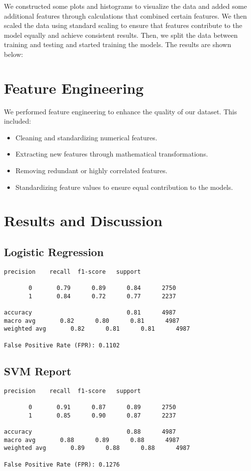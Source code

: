 \documentclass{article}
\begin{document}
We constructed some plots and histograms to visualize the data and added some additional features through calculations that combined certain features. We then scaled the data using standard scaling to ensure that features contribute to the model equally and achieve consistent results. Then, we split the data between training and testing and started training the models. The results are shown below:

\section{Feature Engineering}
We performed feature engineering to enhance the quality of our dataset. This included:
\begin{itemize}
    \item Cleaning and standardizing numerical features.
    \item Extracting new features through mathematical transformations.
    \item Removing redundant or highly correlated features.
    \item Standardizing feature values to ensure equal contribution to the models.
\end{itemize}

\section{Results and Discussion}
\subsection{Logistic Regression}
\begin{verbatim}
precision    recall  f1-score   support

       0       0.79      0.89      0.84      2750
       1       0.84      0.72      0.77      2237

accuracy                           0.81      4987
macro avg       0.82      0.80      0.81      4987
weighted avg       0.82      0.81      0.81      4987

False Positive Rate (FPR): 0.1102  
\end{verbatim}

\subsection{SVM Report}
\begin{verbatim}
precision    recall  f1-score   support

       0       0.91      0.87      0.89      2750
       1       0.85      0.90      0.87      2237

accuracy                           0.88      4987
macro avg       0.88      0.89      0.88      4987
weighted avg       0.89      0.88      0.88      4987

False Positive Rate (FPR): 0.1276
\end{verbatim}
\end{document}
